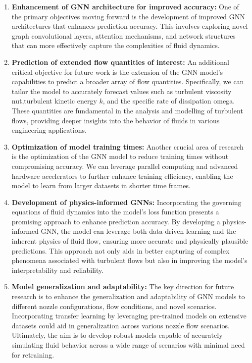 \begin{enumerate}

    \item \textbf{Enhancement of GNN architecture for improved accuracy:} One of the primary objectives moving forward is the development of  improved GNN architectures that enhances prediction accuracy. This involves exploring novel graph convolutional layers, attention mechanisms, and network structures that can more effectively capture the complexities of fluid dynamics. 
    \item \textbf{Prediction of extended flow quantities of interest:} An additional critical objective for future work is the extension of the GNN model's capabilities to predict a broader array of flow quantities. Specifically, we can tailor the model to accurately forecast values such as turbulent viscosity \gls{nut},turbulent kinetic energy $k$, and the specific rate of dissipation \gls{omega}. These quantities are fundamental in the analysis and modelling of turbulent flows, providing deeper insights into the behavior of fluids in various engineering applications.    
    \item \textbf{Optimization of model training times:} Another crucial area of research is the optimization of the GNN model to reduce training times without compromising accuracy. We can leverage parallel computing and advanced hardware accelerators to further enhance training efficiency, enabling the model to learn from larger datasets in shorter time frames.
    
    \item \textbf{Development of physics-informed GNNs:} Incorporating the governing equations of fluid dynamics into the model's loss function presents a promising approach to enhance prediction accuracy. By developing a physics-informed GNN, the model can leverage both data-driven learning and the inherent physics of fluid flow, ensuring more accurate and physically plausible predictions. This approach not only aids in better capturing of complex phenomena associated with turbulent flows but also in improving the model's interpretability and reliability.
    \item \textbf{Model generalization and adaptability:} 
    The key direction for future research is to enhance the generalization and adaptability of GNN models to different nozzle configurations, flow conditions, and novel scenarios. Incorporating transfer learning by leveraging pre-trained models on extensive datasets could aid in generalization across various nozzle flow scenarios. Ultimately, the aim is to develop robust models capable of accurately simulating fluid behavior across a wide range of scenarios with minimal need for retraining. 

       
\end{enumerate}
